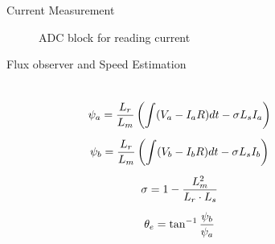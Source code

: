 \begin{frame}{Current Measurement}
	\begin{figure}
		\centering

		\caption{ADC block for reading current}
	\end{figure}
\end{frame}


\begin{frame}{Flux observer and Speed Estimation}
	\begin{columns}
		\begin{figure}
			\centering
		\end{figure}
		\begin{equation*}
			\begin{gathered}
				\psi_a = \frac{L_r}{L_m} \left( \int (V_a - I_a R) dt - \sigma L_s I_a \right) \\
				\addlinespace
				\psi_b = \frac{L_r}{L_m} \left( \int (V_b - I_b R) dt - \sigma L_s I_b \right) \\
				\addlinespace
				\sigma = 1 - \frac{L_m^2}{L_r \cdot L_s} \\
				\addlinespace
				\theta_e = \tan^{-1} \frac{\psi_b}{\psi_a}
			\end{gathered}
		\end{equation*}
	\end{columns}
\end{frame}



